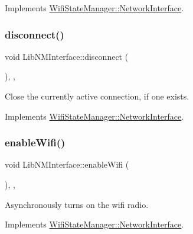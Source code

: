 Implements \mbox{\hyperlink{classWifiStateManager_1_1NetworkInterface_ab0dc19a7f15294a59894581a34d6109e}{Wifi\+State\+Manager\+::\+Network\+Interface}}.

\mbox{\label{classLibNMInterface_af86c4e620e1292428e8955bad4617805}} 
\subsubsection{\texorpdfstring{disconnect()}{disconnect()}}
{\footnotesize\ttfamily void Lib\+N\+M\+Interface\+::disconnect (\begin{DoxyParamCaption}{ }\end{DoxyParamCaption})\hspace{0.3cm}{\ttfamily [override]}, {\ttfamily [protected]}, {\ttfamily [virtual]}}

Close the currently active connection, if one exists. 

Implements \mbox{\hyperlink{classWifiStateManager_1_1NetworkInterface_a440fe19155e268f94cbbd4e133b95037}{Wifi\+State\+Manager\+::\+Network\+Interface}}.

\mbox{\label{classLibNMInterface_ab50348ebed5778ecc56346e7b3419978}} 
\subsubsection{\texorpdfstring{enable\+Wifi()}{enableWifi()}}
{\footnotesize\ttfamily void Lib\+N\+M\+Interface\+::enable\+Wifi (\begin{DoxyParamCaption}{ }\end{DoxyParamCaption})\hspace{0.3cm}{\ttfamily [override]}, {\ttfamily [protected]}, {\ttfamily [virtual]}}

Asynchronously turns on the wifi radio. 

Implements \mbox{\hyperlink{classWifiStateManager_1_1NetworkInterface_a276f17f2d4aa943e9781dcc1b5e93e54}{Wifi\+State\+Manager\+::\+Network\+Interface}}.

\mbox{\label{classLibNMInterface_a92020826593a03979017bd7fb0c143a5}} 
